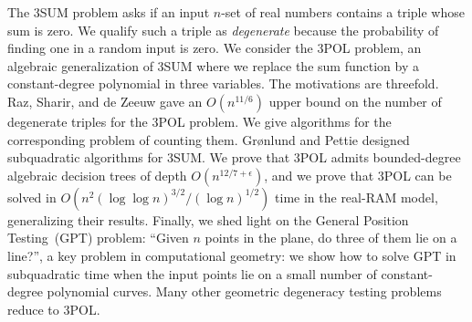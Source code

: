 The 3SUM problem asks if an input $n$-set of real numbers contains a
triple whose sum is zero.
%
We qualify such a triple as \emph{degenerate} because the probability of
finding one in a random input is zero.
%
We consider the 3POL problem, an algebraic generalization of 3SUM where we
replace the sum function by a constant-degree polynomial in three variables.
%
The motivations are threefold.
%
Raz, Sharir, and de Zeeuw gave an $O(n^{11/6})$ upper bound on the number of
degenerate triples for the 3POL problem. We give algorithms for the
corresponding problem of counting them.
%
Gr\o nlund and Pettie designed subquadratic algorithms for 3SUM\@. We
prove that 3POL admits bounded-degree algebraic decision trees of depth
$O(n^{12/7+\epsilon})$, and we prove that 3POL can be solved in $O(n^2
{(\log \log n)}^{3/2} / {(\log n)}^{1/2})$ time in the real-RAM model,
generalizing their results.
%
Finally, we shed light on the General
Position Testing~(GPT) problem: ``Given $n$ points in the plane, do three of
them lie on a line?'', a key problem in computational geometry: we show how to
solve GPT in subquadratic time when the input points lie on a small number of
constant-degree polynomial curves. Many other geometric degeneracy testing
problems reduce to 3POL\@.
%

